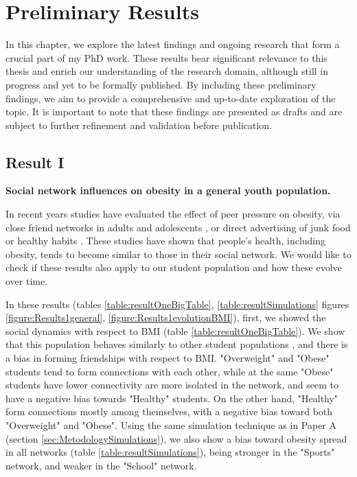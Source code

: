 \chapter{Preliminary Results}
\label{chapter:chapter results}

In this chapter, we explore the latest findings and ongoing research that form a crucial part of my PhD work. These results bear significant relevance to this thesis and enrich our understanding of the research domain, although still in progress and yet to be formally published. By including these preliminary findings, we aim to provide a comprehensive and up-to-date exploration of the topic. It is important to note that these findings are presented as drafts and are subject to further refinement and validation before publication.

\section{Result I}

\textbf{Social network influences on obesity in a general youth population.}

In recent years studies have evaluated the effect of peer pressure on obesity, via close friend networks in adults \cite{Christakis2007, Oliveira2013, Powell2015} and adolescents \cite{Fowler2008}, or direct advertising of junk food \cite{Dixon2007} or healthy habits \cite{Turner2017}. These studies have shown that people’s health, including obesity, tends to become similar to those in their social network. We would like to check if these results also apply to our student population and how these evolve over time.

In these results (tables \ref{table:resultOneBigTable}, \ref{table:resultSimulations}  figures \ref{figure:Results1general}, \ref{figure:Results1evolutionBMI}), first, we showed the social dynamics with respect to BMI (table \ref{table:resultOneBigTable}). We show that this population behaves similarly to other student populations \cite{DIXON20071311, Deoke2012, Lasserre2007}, and there is a bias in forming friendships with respect to BMI. "Overweight" and "Obese" students tend to form connections with each other, while at the same "Obese" students have lower connectivity are more isolated in the network, and seem to have a negative bias towards "Healthy" students. On the other hand, "Healthy" form connections mostly among themselves, with a negative bias toward both "Overweight" and "Obese". Using the same simulation technique as in Paper A (section \ref{sec:MetodologySimulations}), we also show a bias toward obesity spread in all networks (table \ref{table:resultSimulations}), being stronger in the "Sports" network, and weaker in the "School" network.

